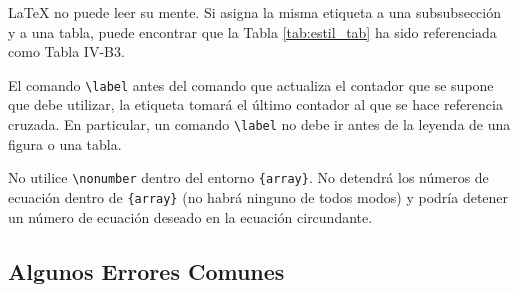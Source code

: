 {\LaTeX} no puede leer su mente. Si asigna la misma etiqueta a una subsubsección y a una tabla, puede encontrar que la Tabla \ref{tab:estil_tab} ha sido referenciada como Tabla IV-B3. \par

El comando \verb|\label| antes del comando que actualiza el contador que se supone que debe utilizar, la etiqueta tomará el último contador al que se hace referencia cruzada. En particular, un comando \verb|\label| no debe ir antes de la leyenda de una figura o una tabla. \par

No utilice \verb|\nonumber| dentro del entorno \verb|{array}|. No detendrá los números de ecuación dentro de \verb|{array}| (no habrá ninguno de todos modos) y podría detener un número de ecuación deseado en la ecuación circundante.

\subsection{Algunos Errores Comunes} \label{subsec:error_comun}

